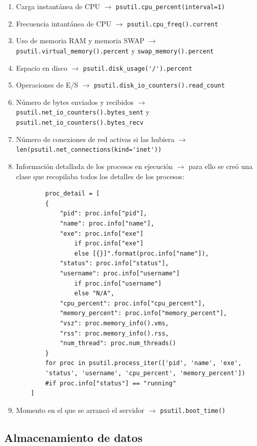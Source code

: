 \documentclass{article}
\begin{document}
\begin{enumerate}
    \item Carga instantánea de CPU $ \rightarrow $ \lstinline{psutil.cpu_percent(interval=1)}
    \item Frecuencia intantánea de CPU $ \rightarrow $ \lstinline{psutil.cpu_freq().current}
    \item Uso de memoria RAM y memoria SWAP $ \rightarrow $ \lstinline{psutil.virtual_memory().percent} y \lstinline{swap_memory().percent}
    \item Espacio en disco $ \rightarrow $ \lstinline{psutil.disk_usage('/').percent}
    \item Operaciones de E/S $ \rightarrow $ \lstinline{psutil.disk_io_counters().read_count}
    \item Número de bytes enviados y recibidos  $ \rightarrow $ \lstinline{psutil.net_io_counters().bytes_sent} y \lstinline{psutil.net_io_counters().bytes_recv}
    \item Número de conexiones de red activas si las hubiera  $ \rightarrow $ \lstinline{len(psutil.net_connections(kind='inet'))}
    \item Información detallada de los procesos en ejecución  $ \rightarrow $ para ello se creó una clase que recopilaba todos los detalles de los procesos:
    \begin{verbatim}
        proc_detail = [
        {
            "pid": proc.info["pid"],
            "name": proc.info["name"],
            "exe": proc.info["exe"] 
                if proc.info["exe"] 
                else [{}]".format(proc.info["name"]),
            "status": proc.info["status"],
            "username": proc.info["username"] 
                if proc.info["username"] 
                else "N/A",
            "cpu_percent": proc.info["cpu_percent"],
            "memory_percent": proc.info["memory_percent"],
            "vsz": proc.memory_info().vms,
            "rss": proc.memory_info().rss,
            "num_thread": proc.num_threads()
        }
        for proc in psutil.process_iter(['pid', 'name', 'exe',
        'status', 'username', 'cpu_percent', 'memory_percent'])
        #if proc.info["status"] == "running"
    ]
    \end{verbatim}
    \item Momento en el que se arrancó el servidor $ \rightarrow $ \lstinline{psutil.boot_time()}
\end{enumerate}

\subsection{Almacenamiento de datos}\label{subsec:almacenamiento-datos}
\end{document}
